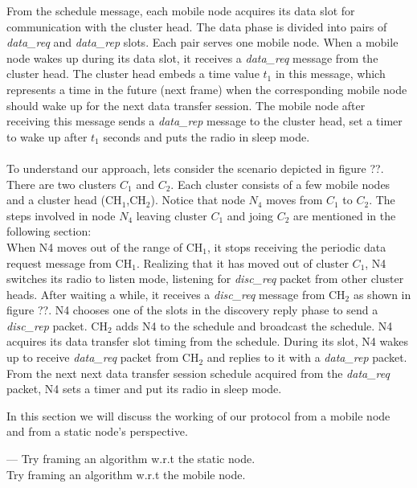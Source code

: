 \documentclass[a4paper, conference, 10pt]{IEEEtran}
\begin{document}
From the schedule message, each mobile node acquires its data slot for communication with the cluster head. The data phase is divided into pairs of \emph{data\_req} and \emph{data\_rep} slots. Each pair serves one mobile node. When a mobile node wakes up during its data slot, it receives a \emph{data\_req} message from the cluster head. The cluster head embeds a time value \emph{$t_1$} in this message, which represents a time in the future (next frame) when the corresponding mobile node should wake up for the next data transfer session. The mobile node after receiving this message sends a \emph{data\_rep} message to the cluster head, set a timer to wake up after \emph{$t_1$} seconds and puts the radio in sleep mode. \\\\

To understand our approach, lets consider the scenario depicted in figure ??. There are two clusters $C_1$ and $C_2$. Each cluster consists of a few mobile nodes and a cluster head (CH$_1$,CH$_2$). Notice that node \emph{$N_4$} moves from $C_1$ to $C_2$. The steps involved in node $N_4$ leaving cluster $C_1$ and joing $C_2$ are mentioned in the following section: \\

When N4 moves out of the range of CH$_1$, it stops receiving the periodic data request message from CH$_1$. Realizing that it has moved out of cluster $C_1$, N4 switches its radio to listen mode, listening for \emph{disc\_req} packet from other cluster heads. After waiting a while, it receives a \emph{disc\_req} message from CH$_2$ as shown in figure ??. N4 chooses one of the slots in the discovery reply phase to send a \emph{disc\_rep} packet. CH$_2$ adds N4 to the schedule and broadcast the schedule. N4 acquires its data transfer slot timing from the schedule. During its slot, N4 wakes up to receive \emph{data\_req} packet from CH$_2$ and replies to it with a \emph{data\_rep} packet. From the next next data transfer session schedule acquired from the \emph{data\_req} packet, N4 sets a timer and put its radio in sleep mode. 

\iffalse 
In this section we will discuss the working of our protocol from a mobile node and from a static node's perspective. 

--- Try framing an algorithm w.r.t the static node. \\

Try framing an algorithm w.r.t the mobile node. \\
\end{document}
